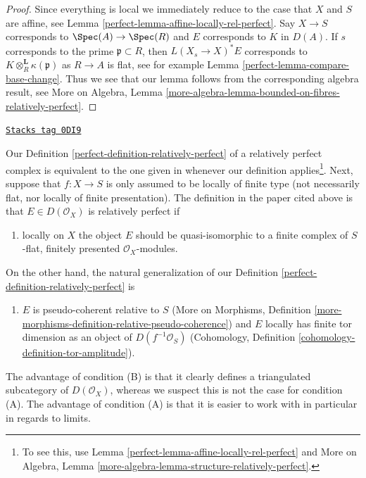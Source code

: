 \begin{proof}

Since everything is local we immediately reduce to the
case that $X$ and $S$ are affine, see Lemma
\ref{perfect-lemma-affine-locally-rel-perfect}.
Say $X \to S$ corresponds to $\Spec(A) \to \Spec(R)$ and
$E$ corresponds to $K$ in $D(A)$. If $s$ corresponds to
the prime $\mathfrak p \subset R$, then $L(X_s \to X)^*E$
corresponds to $K \otimes_R^\mathbf{L} \kappa(\mathfrak p)$
as $R \to A$ is flat, see for example
Lemma \ref{perfect-lemma-compare-base-change}.
Thus we see that our lemma follows from the corresponding algebra
result, see More on Algebra, Lemma
\ref{more-algebra-lemma-bounded-on-fibres-relatively-perfect}.
\end{proof}

\begin{remark}
\label{perfect-remark-discuss-rel-perfect}
\href{https://stacks.math.columbia.edu/tag/0DI9}{\texttt{Stacks tag 0DI9}}

Our Definition \ref{perfect-definition-relatively-perfect} of a
relatively perfect complex is equivalent to the one given
in \cite{lieblich-complexes} whenever our definition applies\footnote{To
see this, use Lemma \ref{perfect-lemma-affine-locally-rel-perfect} and
More on Algebra, Lemma \ref{more-algebra-lemma-structure-relatively-perfect}.}.
Next, suppose that $f : X \to S$ is only assumed to be locally
of finite type (not necessarily flat, nor locally of finite
presentation). The definition in the paper cited above is that
$E \in D(\mathcal{O}_X)$ is relatively perfect if
\begin{enumerate}
\item[(A)] locally on $X$ the object $E$ should be
quasi-isomorphic to a finite complex of
$S$-flat, finitely presented $\mathcal{O}_X$-modules.
\end{enumerate}
On the other hand, the natural generalization of our
Definition \ref{perfect-definition-relatively-perfect} is
\begin{enumerate}
\item[(B)] $E$ is pseudo-coherent relative to $S$
(More on Morphisms, Definition
\ref{more-morphisms-definition-relative-pseudo-coherence})
and $E$ locally has finite tor dimension as an object of
$D(f^{-1}\mathcal{O}_S)$
(Cohomology, Definition \ref{cohomology-definition-tor-amplitude}).
\end{enumerate}
The advantage of condition (B) is that it clearly defines a triangulated
subcategory of $D(\mathcal{O}_X)$, whereas we suspect this is not
the case for condition (A). The advantage of condition (A)
is that it is easier to work with in particular in regards to limits.
\end{remark}


